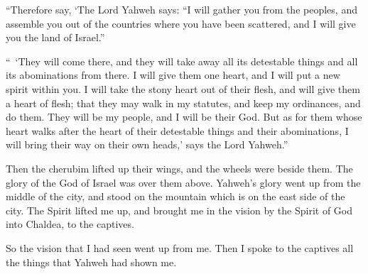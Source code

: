 {\par }{\PP {}“Therefore say, ‘The Lord Yahweh says: “I will gather you from the peoples, and assemble you out of the countries where you have been scattered, and I will give you the land of Israel.”
\par }{\PP {}“ ‘They will come there, and they will take away all its detestable things and all its abominations from there.
I will give them one heart, and I will put a new spirit within you. I will take the stony heart out of their flesh, and will give them a heart of flesh;
that they may walk in my statutes, and keep my ordinances, and do them. They will be my people, and I will be their God.
But as for them whose heart walks after the heart of their detestable things and their abominations, I will bring their way on their own heads,’ says the Lord Yahweh.”
\par }{\PP {}Then the cherubim lifted up their wings, and the wheels were beside them. The glory of the God of Israel was over them above.
Yahweh’s glory went up from the middle of the city, and stood on the mountain which is on the east side of the city.
The Spirit lifted me up, and brought me in the vision by the Spirit of God into Chaldea, to the captives.
\par }{\PP So the vision that I had seen went up from me.
Then I spoke to the captives all the things that Yahweh had shown me.

}
